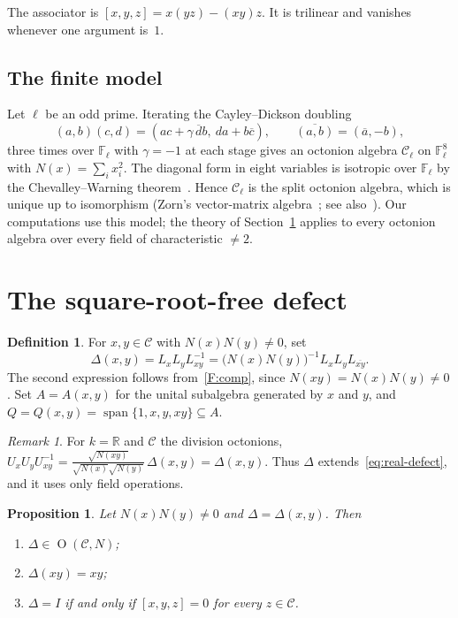 \documentclass[11pt]{amsart}
\newtheorem{proposition}[theorem]{Proposition}
\theoremstyle{definition}
\newtheorem{definition}[theorem]{Definition}
\theoremstyle{remark}
\newtheorem{remark}[theorem]{Remark}
\newcommand{\F}{\mathbb{F}}
\newcommand{\R}{\mathbb{R}}
\newcommand{\C}{\mathcal{C}}
\newcommand{\conj}[1]{\overline{#1}}
\newcommand{\assoc}[3]{[#1,#2,#3]}
\DeclareMathOperator{\Ort}{O}
\DeclareMathOperator{\spn}{span}
\begin{document}
The associator is $\assoc{x}{y}{z}=x(yz)-(xy)z$. It is trilinear and vanishes
whenever one argument is~$1$.

\subsection*{The finite model}
Let $\ell$ be an odd prime. Iterating the Cayley--Dickson doubling
\begin{equation}\label{eq:cd}
  (a,b)(c,d)=(ac+\gamma\,\conj{d}b,\ da+b\conj{c}),\qquad
  \conj{(a,b)}=(\conj{a},-b),
\end{equation}
three times over $\F_\ell$ with $\gamma=-1$ at each stage gives an octonion
algebra $\C_\ell$ on $\F_\ell^8$ with $N(x)=\sum_i x_i^2$. The diagonal form
in eight variables is isotropic over $\F_\ell$ by the Chevalley--Warning
theorem~\cite{chevalley1935,warning1935}. Hence $\C_\ell$ is the split
octonion algebra, which is unique up to isomorphism (Zorn's vector-matrix
algebra~\cite{zorn1933}; see also~\cite[Ch.~1]{springer2000}). Our
computations use this model; the theory of Section~\ref{sec:defect} applies to
every octonion algebra over every field of characteristic $\neq2$.

\section{The square-root-free defect}\label{sec:defect}

\begin{definition}
For $x,y\in\C$ with $N(x)N(y)\neq0$, set
\[
  \Delta(x,y)=L_xL_yL_{xy}^{-1}
  =\bigl(N(x)N(y)\bigr)^{-1}L_xL_yL_{\conj{xy}}.
\]
The second expression follows from~\ref{F:comp}, since
$N(xy)=N(x)N(y)\neq0$. Set $A=A(x,y)$ for the unital subalgebra generated by
$x$ and $y$, and $Q=Q(x,y)=\spn\{1,x,y,xy\}\subseteq A$.
\end{definition}

\begin{remark}\label{rem:real}
For $k=\R$ and $\C$ the division octonions,
$U_xU_yU_{xy}^{-1}=\frac{\sqrt{N(xy)}}{\sqrt{N(x)}\sqrt{N(y)}}\,\Delta(x,y)
=\Delta(x,y)$. Thus $\Delta$ extends~\eqref{eq:real-defect}, and it uses only
field operations.
\end{remark}

\begin{proposition}\label{prop:basic}
Let $N(x)N(y)\neq0$ and $\Delta=\Delta(x,y)$. Then
\begin{enumerate}[label=\textup{(\alph*)}]
\item $\Delta\in\Ort(\C,N)$;
\item $\Delta(xy)=xy$;
\item $\Delta=I$ if and only if $\assoc{x}{y}{z}=0$ for every $z\in\C$.
\end{enumerate}
\end{proposition}
\end{document}
